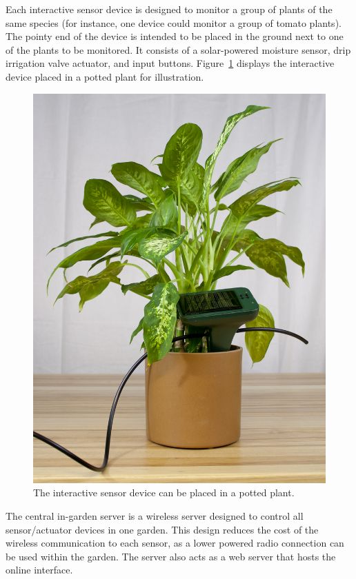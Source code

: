 \documentclass[11pt]{article}
\begin{document}
Each interactive sensor device is designed to monitor a group of plants of the same species (for instance, one device could monitor a group of tomato plants). The pointy end of the device is intended to be placed in the ground next to one of the plants to be monitored. It consists of a solar-powered moisture sensor, drip irrigation valve actuator, and input buttons. Figure~\ref{fig:plant_vertical} displays the interactive device placed in a potted plant for illustration.

\begin{figure}[h!]
\begin{center}
\includegraphics[scale=0.15]{./pngs/plant_vertical.jpg}
\end{center}
\caption{The interactive sensor device can be placed in a potted plant.}
\label{fig:plant_vertical}
\end{figure}

The central in-garden server is a wireless server designed to control all sensor/actuator devices in one garden. This design reduces the cost of the wireless communication to each sensor, as a lower powered radio connection can be used within the garden. The server also acts as a web server that hosts the online interface.
\end{document}
